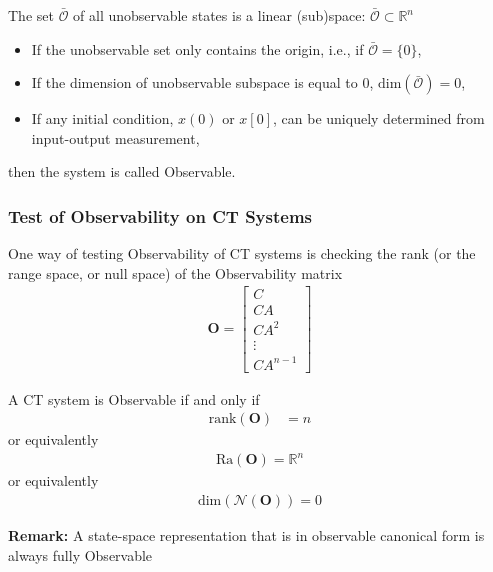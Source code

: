 \documentclass[twoside]{article}
\begin{document}
  The set $\bar{\mathcal{O}}$ of all unobservable states is a linear
  (sub)space: $\bar{\mathcal{O}} \subset \mathbb{R}^n$

\begin{itemize}
%
 \item If the unobservable set only contains the origin, 
   i.e., if $\bar{\mathcal{O}} = \lbrace 0 \rbrace$, 
%
 \item If the dimension of unobservable subspace is equal to 0,
   $\mathrm{dim} \left( \bar{\mathcal{O}} \right) = 0$,
 \item If any initial condition, $x(0)$ or $x[0]$, can be uniquely 
 determined from input-output measurement,
%
\end{itemize} 
then the system is called Observable. 

\subsubsection{Test of Observability on CT Systems}

One way of testing Observability of CT systems is checking the rank
(or the range space, or null space) of the Observability matrix
%
\begin{align*}
  \mathbf{O} =
\left[ \begin{array}{c}
C 
\\
C A
\\
C A^2 
\\
  \vdots
\\
C A^{n-1}
\end{array}
\right] 
\end{align*} 
%

A CT system is Observable if and only if
%
\begin{align*}
  \mathrm{rank} ( \mathbf{O} ) &= n
\end{align*} 
%
or equivalently 
%
\begin{align*}
 \mathrm{Ra} ( \mathbf{O} ) = \mathbb{R}^n
\end{align*} 
%
or equivalently 
%
\begin{align*}
 \mathrm{dim} \left ( \mathcal{N} ( \mathbf{O} ) \right) = 0
\end{align*} 

\vspace{6pt}

\textbf{Remark:} A state-space representation that is
in observable canonical form is always fully Observable

\vspace{6pt}
\end{document}
